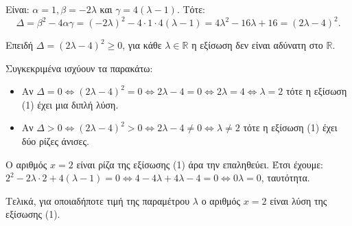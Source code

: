 
\begin{alist}
\item Είναι: $\alpha = 1, \beta = -2\lambda$ και $\gamma = 4(\lambda - 1)$.
Τότε:
\[\Delta = \beta^2 - 4\alpha\gamma = (-2\lambda)^2 - 4 \cdot 1 \cdot 4(\lambda - 1) = 4\lambda^2 - 16\lambda + 16 = (2\lambda - 4)^2.\]

\item Επειδή $\Delta = (2\lambda - 4)^2 \ge 0$, για κάθε $\lambda \in \mathbb{R}$ η εξίσωση δεν είναι αδύνατη στο $\mathbb{R}$.

Συγκεκριμένα ισχύουν τα παρακάτω:
\begin{itemize}
\item Αν $\Delta = 0 \Leftrightarrow (2\lambda - 4)^2 = 0 \Leftrightarrow 2\lambda - 4 = 0 \Leftrightarrow 2\lambda = 4 \Leftrightarrow \lambda = 2$
τότε η εξίσωση (1) έχει μια διπλή λύση.

\item Αν $\Delta > 0 \Leftrightarrow (2\lambda - 4)^2 > 0 \Leftrightarrow 2\lambda - 4 \ne 0 \Leftrightarrow \lambda \ne 2$
τότε η εξίσωση (1) έχει δύο ρίζες άνισες.
\end{itemize}

\item Ο αριθμός $x = 2$ είναι ρίζα της εξίσωσης (1) άρα την επαληθεύει.
Έτσι έχουμε:
$2^2 - 2\lambda \cdot 2 + 4(\lambda - 1) = 0 \Leftrightarrow 4 - 4\lambda + 4\lambda - 4 = 0 \Leftrightarrow 0\lambda = 0$, ταυτότητα.

Τελικά, για οποιαδήποτε τιμή της παραμέτρου $\lambda$ ο αριθμός $x = 2$ είναι λύση της
εξίσωσης (1).
\end{alist}

